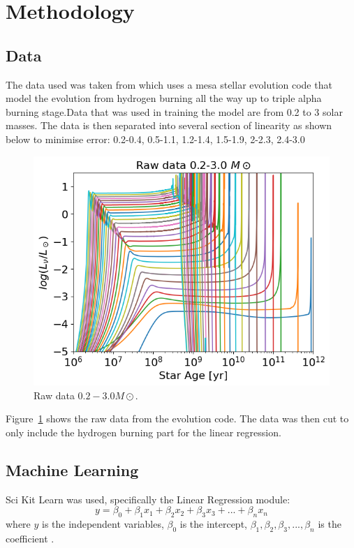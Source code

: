 \section{Methodology}

\subsection{Data}
 

The data used was taken from  which uses a mesa stellar evolution code that model the evolution from hydrogen burning all the way up to triple alpha burning stage.Data that was used in training the model are from 0.2 to 3 solar masses. The data is then separated into several section of linearity as shown below to minimise error:
0.2-0.4, 0.5-1.1, 1.2-1.4, 1.5-1.9, 2-2.3, 2.4-3.0


\begin{figure}[H]
	\centering
	\includegraphics[width=\textwidth,height=\textheight]{assets/raw.png}
	\caption{Raw data $0.2-3.0 M\odot$.}
	\label{fig:raw}
\end{figure}

Figure~\ref{fig:raw}
shows the raw data from the evolution code. The data was then cut to only include the hydrogen burning part for the linear regression.

\subsection{Machine Learning}
Sci Kit Learn was used, specifically the Linear Regression module:
\begin{equation}
    y=\beta_{0}+\beta_{1}x_1+\beta_{2}x_2+\beta_{3}x_3+...+\beta_{n}x_n
\end{equation}
where 
$y$ is the independent variables, $\beta_0$ is the intercept, $\beta_{1}, \beta_{2}, \beta_{3},..., \beta_{n}$ is the coefficient . 

